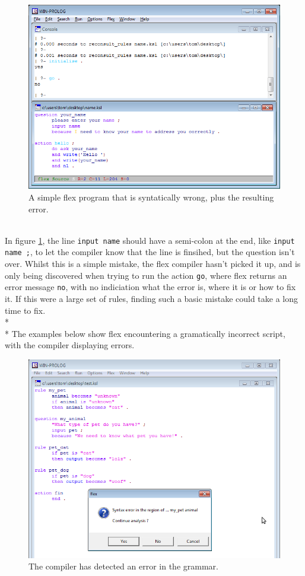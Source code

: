 \documentclass[12pt]{report}
\begin{document}
\begin{figure}[h!]
	\centering
		\includegraphics[scale=0.85]{flexfail}
		\caption{A simple flex program that is syntatically wrong, plus the resulting error.}\label{fig:flexfail}
\end{figure}
\\
In figure \ref{fig:flexfail}, the line \texttt{input name} should have a semi-colon at the end, like \texttt{input name ;}, to let the compiler know that the line is finsihed, but the question isn't over.  Whilst this is a simple mistake, the flex compiler hasn't picked it up, and is only being discovered when trying to run the action \texttt{go}, where flex returns an error message \texttt{no}, with no indiciation what the error is, where it is or how to fix it.  If this were a large set of rules, finding such a basic mistake could take a long time to fix.
\\*
\\*
The examples below show flex encountering a gramatically incorrect script, with the compiler displaying errors.
\begin{figure}[h]
	\centering
		\includegraphics[scale=0.65]{flex_error1}
		\caption{The compiler has detected an error in the grammar.}
\end{figure}
\end{document}
